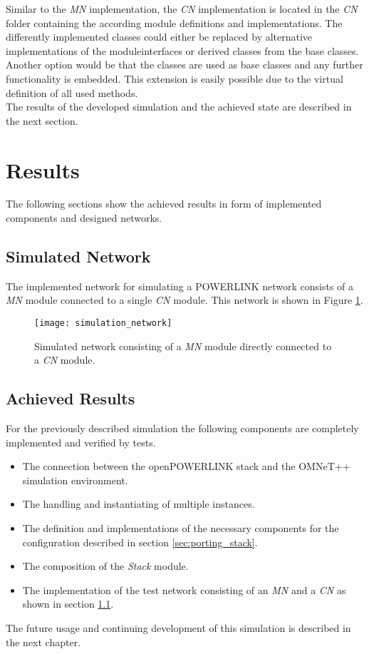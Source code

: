 Similar to the \emph{MN} implementation, the \emph{CN} implementation is located in the \emph{CN} folder containing the according module definitions and implementations.
The differently implemented classes could either be replaced by alternative implementations of the moduleinterfaces or derived classes from the base classes.
Another option would be that the classes are used as base classes and any further functionality is embedded.
This extension is easily possible due to the virtual definition of all used methods.
\\

The results of the developed simulation and the achieved state are described in the next section.

\section{Results}
\label{sec:porting_results}
The following sections show the achieved results in form of implemented components and designed networks.

\subsection{Simulated Network}
\label{sec:porting_results_network}
The implemented network for simulating a POWERLINK network consists of a \emph{MN} module connected to a single \emph{CN} module.
This network is shown in Figure \ref{fig:simulation_network}.

\begin{figure}
    \centering
    \texttt{[image: simulation\_network]}
    \caption{Simulated network consisting of a \emph{MN} module directly connected to a \emph{CN} module.}
    \label{fig:simulation_network}
\end{figure}

\subsection{Achieved Results}
\label{sec:porting_results_achieved}

For the previously described simulation the following components are completely implemented and verified by tests.

\begin{itemize}
    \item The connection between the openPOWERLINK stack and the OMNeT++ simulation environment.
    \item The handling and instantiating of multiple instances.
    \item The definition and implementations of the necessary components for the configuration described in section \ref{sec:porting_stack}.
    \item The composition of the \emph{Stack} module.
    \item The implementation of the test network consisting of an \emph{MN} and a \emph{CN} as shown in section \ref{sec:porting_results_network}.
\end{itemize}

The future usage and continuing development of this simulation is described in the next chapter.